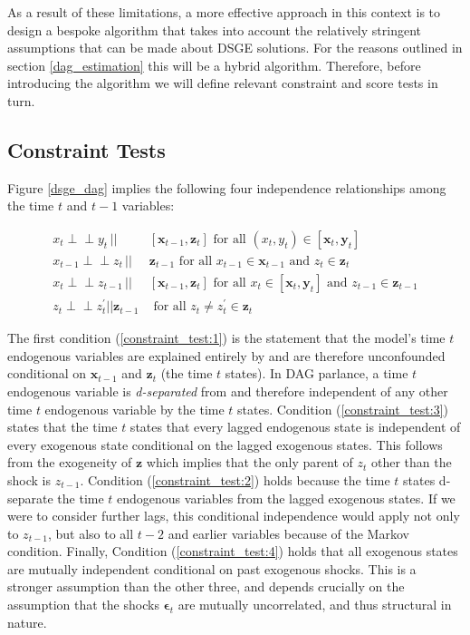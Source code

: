 \documentclass{article}
\def\indep{\perp \!\!\! \perp}
\begin{document}
As a result of these limitations, a more effective approach in this context is to design a bespoke algorithm that takes into account the relatively stringent assumptions that can be made about DSGE solutions. For the reasons outlined in section \ref{dag_estimation} this will be a hybrid algorithm. Therefore, before introducing the algorithm we will define relevant constraint and score tests in turn.

\subsection{Constraint Tests} \label{constrainttests}

Figure \ref{dsge_dag} implies the following four independence relationships among the time $t$ and $t-1$ variables:

\begin{align}
  x_t \indep y_t \,||\,& [\mathbf{x}_{t-1},\mathbf{z}_t] \text{ for all } (x_t, y_t) \in [\mathbf{x}_t, \mathbf{y}_t] \label{constraint_test:1} \\
  x_{t-1} \indep z_{t} \,||\,& \mathbf{z}_{t-1} \text{ for all } x_{t-1} \in \mathbf{x}_{t-1} \text{ and } z_{t} \in \mathbf{z}_t \label{constraint_test:3} \\
  x_t \indep z_{t-1} \,||\,& [\mathbf{x}_{t-1}, \mathbf{z}_t] \text{ for all } x_t \in [\mathbf{x}_t, \mathbf{y}_t] \text{ and } z_{t-1} \in \mathbf{z}_{t-1} \label{constraint_test:2} \\
  z_t \indep z^{\prime}_{t} || \mathbf{z}_{t-1} & \text{ for all } z_t \not = z^{\prime}_{t} \in \mathbf{z}_t \label{constraint_test:4}
\end{align}

The first condition (\ref{constraint_test:1}) is the statement that the model's time $t$ endogenous variables are explained entirely by and are therefore unconfounded conditional on $\mathbf{x}_{t-1}$ and $\mathbf{z}_t$ (the time $t$ states). In DAG parlance, a time $t$ endogenous variable is \textit{d-separated} from and therefore independent of any other time $t$ endogenous variable by the time $t$ states. Condition (\ref{constraint_test:3}) states that the time $t$ states that every lagged endogenous state is independent of every exogenous state conditional on the lagged exogenous states. This follows from the exogeneity of $\mathbf{z}$ which implies that the only parent of $z_t$ other than the shock is $z_{t-1}$. Condition (\ref{constraint_test:2}) holds because the time $t$ states d-separate the time $t$ endogenous variables from the lagged exogenous states. If we were to consider further lags, this conditional independence would apply not only to $z_{t-1}$, but also to all $t-2$ and earlier variables because of the Markov condition. Finally, Condition (\ref{constraint_test:4}) holds that all exogenous states are mutually independent conditional on past exogenous shocks. This is a stronger assumption than the other three, and depends crucially on the assumption that the shocks $\mathbf{\epsilon}_t$ are mutually uncorrelated, and thus structural in nature.
\end{document}
